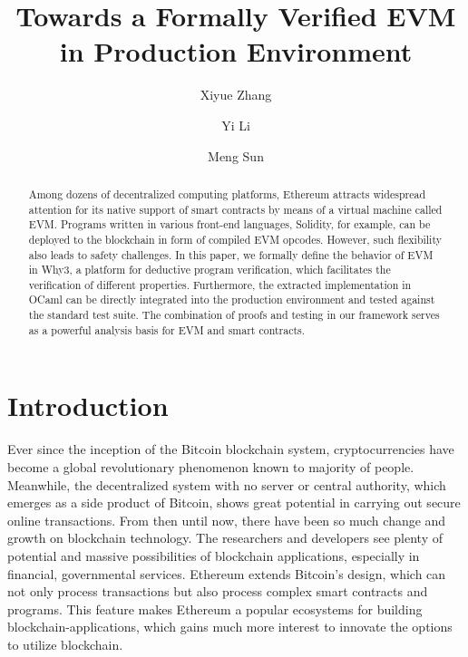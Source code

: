 \documentclass[runningheads]{llncs}
\begin{document}
%
\title{Towards a Formally Verified EVM in Production Environment}
%
%
\author{Xiyue Zhang \and
Yi Li \and
Meng Sun
}
%
%
%
\maketitle              %
%
\begin{abstract}
Among dozens of decentralized computing platforms, Ethereum attracts widespread attention for its native support of smart contracts by means of a virtual machine called EVM. Programs written in various front-end languages, Solidity, for example, can be deployed to the blockchain in form of compiled EVM opcodes. However, such flexibility also leads to safety challenges. In this paper, we formally define the behavior of EVM in Why3, a platform for deductive program verification, which facilitates the verification of different properties. Furthermore, the extracted implementation in OCaml can be directly integrated into the production environment and tested against the standard test suite. The combination of proofs and testing in our framework serves as a powerful analysis basis for EVM and smart contracts.

\end{abstract}
%
%
%
\section{Introduction}
Ever since the inception of the Bitcoin \cite{nakamoto2008bitcoin} blockchain system, cryptocurrencies have become a global revolutionary phenomenon known to majority of people. Meanwhile, the decentralized system with no server or central authority, which emerges as a side product of Bitcoin, shows great potential in carrying out secure online transactions. From then until now, there have been so much change and growth on blockchain technology. The researchers and developers see plenty of potential and massive possibilities of blockchain applications, especially in financial, governmental services. Ethereum\cite{Ethereum} extends Bitcoin's design, which can not only process transactions but also process complex smart contracts and programs. This feature makes Ethereum a popular ecosystems for building blockchain-applications, which gains much more interest to innovate the options to utilize blockchain.
\end{document}
